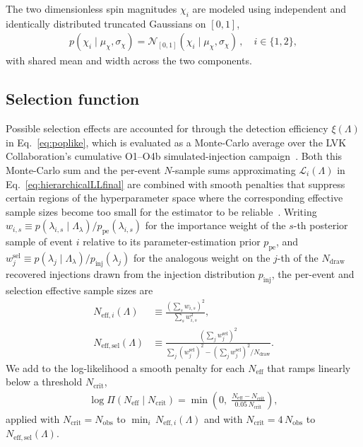 \documentclass[aps,prd,reprint,twocolumn,10pt,eqsecnum,showpacs,nofootinbib,amsfonts,amssymb,amsmath,longbibliography,superscriptaddress,floatfix]{revtex4-1}
\begin{document}
The two dimensionless spin magnitudes $\chi_{i}$ are modeled using independent and identically distributed truncated Gaussians on $[0, 1]$,
\begin{align}
\label{eq:spin-mag-density}
p(\chi_{i} \mid \mu_{\chi}, \sigma_{\chi}) = \mathcal{N}_{[0, 1]}(\chi_{i} \mid \mu_{\chi}, \sigma_{\chi}) \, , \quad i \in \{1, 2\},
\end{align}
with shared mean and width across the two components.

\subsection{Selection function}
\label{sec:appendix-memory-selection}

Possible selection effects are accounted for through the detection efficiency $\xi(\Lambda)$ in Eq.~\eqref{eq:poplike}, which is evaluated as a Monte-Carlo average over the LVK Collaboration's cumulative O1--O4b simulated-injection campaign~\cite{Essick:2025zed,LVK:GWTC5CumulativeSensitivity}. Both this Monte-Carlo sum and the per-event $N$-sample sums approximating $\mathcal{L}_{i}(\Lambda)$ in Eq.~\eqref{eq:hierarchicalLLfinal} are combined with smooth penalties that suppress certain regions of the hyperparameter space where the corresponding effective sample sizes become too small for the estimator to be reliable~\cite{Tiwari:2017ndi,Farr:2019rap,Essick:2022ojx,Talbot:2023pex,Heinzel:2025ogf}. Writing $w_{i,s} \equiv p(\lambda_{i,s} \mid \Lambda_{\lambda})/p_{\mathrm{pe}}(\lambda_{i,s})$ for the importance weight of the $s$-th posterior sample of event $i$ relative to its parameter-estimation prior $p_{\mathrm{pe}}$, and $w_{j}^{\mathrm{sel}} \equiv p(\lambda_{j} \mid \Lambda_{\lambda})/p_{\mathrm{inj}}(\lambda_{j})$ for the analogous weight on the $j$-th of the $N_{\mathrm{draw}}$ recovered injections drawn from the injection distribution $p_{\mathrm{inj}}$, the per-event and selection effective sample sizes are
\begin{align}
\label{eq:neff-event}
N_{\mathrm{eff}, i}(\Lambda) &\equiv \frac{\left(\sum_{s} w_{i,s}\right)^{2}}{\sum_{s} w_{i,s}^{2}},\\
\label{eq:neff-sel}
N_{\mathrm{eff,sel}}(\Lambda) &\equiv \frac{\left(\sum_{j} w_{j}^{\mathrm{sel}}\right)^{2}}{\sum_{j} \left(w_{j}^{\mathrm{sel}}\right)^{2} - \left(\sum_{j} w_{j}^{\mathrm{sel}}\right)^{2} \! / N_{\mathrm{draw}}}.
\end{align}
We add to the log-likelihood a smooth penalty for each $N_{\mathrm{eff}}$ that ramps linearly below a threshold $N_{\mathrm{crit}}$,
\begin{align}
\label{eq:neff-penalty}
\log \Pi(N_{\mathrm{eff}} \mid N_{\mathrm{crit}}) = \min\!\left(0,\; \frac{N_{\mathrm{eff}} - N_{\mathrm{crit}}}{0.05\, N_{\mathrm{crit}}}\right),
\end{align}
applied with $N_{\mathrm{crit}} = N_{\mathrm{obs}}$ to $\min_{i}\, N_{\mathrm{eff}, i}(\Lambda)$ and with $N_{\mathrm{crit}} = 4\, N_{\mathrm{obs}}$ to $N_{\mathrm{eff,sel}}(\Lambda)$.



\end{document}

